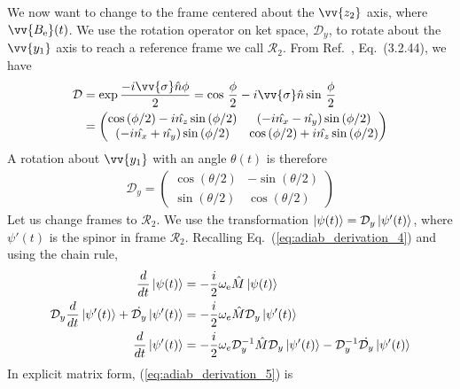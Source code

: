 %
We now want to change to the frame centered about the $\vv{z_2}$ axis, where $\vv{B_\text{e}}(t)$. We use the rotation operator on ket space, $\mathcal{D}_y$, to rotate about the $\vv{y_1}$ axis to reach a reference frame we call $\mathcal{R}_2$. From Ref.~\cite{sakurai_quantum}, Eq.~(3.2.44), we have
%
\begin{align}
    \mathcal{D} &= \exp{\frac{-i\vv{\sigma}\hat{n}\phi}{2}}=\cos \, \frac{\phi}{2}
                            -i\vv{\sigma}\hat{n} \sin \, \frac{\phi}{2} \nonumber \\
                &= \left(\begin{matrix}\cos\left(\phi / 2\right)-i\hat{n_{z}}\sin\left(\phi / 2\right) & (-i\hat{n_{x}}-\hat{n_{y}})\sin\left(\phi / 2\right) \\
                (-i\hat{n_{x}}+\hat{n_{y}})\sin\left(\phi / 2\right) & \cos\left(\phi / 2\right)+i\hat{n_{z}}\sin\left(\phi / 2\right)
                \end{matrix}\right) \label{eq:rotation_operator}
\end{align}
%
A rotation about $\vv{y_1}$ with an angle $\theta(t)$ is therefore
%
\begin{align}
    \mathcal{{D}}_{y}=\left(\begin{matrix}
    \cos\left(\theta / 2\right) & -\sin\left(\theta / 2\right)\\
    \sin\left(\theta / 2\right) & \cos\left(\theta / 2\right)
    \end{matrix}\right)
\end{align}
%
Let us change frames to $\mathcal{R}_2$. We use the transformation $\Ket{\psi(t)}=\mathcal{{D}}_{y}\Ket{\psi'(t)}$, where $\psi'(t)$ is the spinor in frame $\mathcal{R}_2$. Recalling Eq.~(\ref{eq:adiab_derivation_4}) and using the chain rule,
%
\begin{align}
    \frac{d}{dt}\Ket{\psi(t)} &= -\frac{i}{2}\omega_\text{e}\hat{M}\Ket{\psi(t)} \nonumber \\
    \mathcal{{D}}_{y}\frac{d}{dt}\Ket{\psi'(t)}+\dot{\mathcal{{D}}_{y}}\Ket{\psi'(t)}&=-\frac{i}{2}\omega_{e}\hat{M}\mathcal{{D}}_{y}\Ket{\psi'(t)} \nonumber \\
    \frac{d}{dt}\Ket{\psi'(t)}&=-\frac{i}{2}\omega_{e}\mathcal{{D}}_{y}^{-1}\hat{M}\mathcal{{D}}_{y}\Ket{\psi'(t)}-\mathcal{{D}}_{y}^{-1}\dot{\mathcal{{D}}_{y}}\Ket{\psi'(t)}
    \label{eq:adiab_derivation_5}
\end{align}
%
In explicit matrix form, (\ref{eq:adiab_derivation_5}) is
